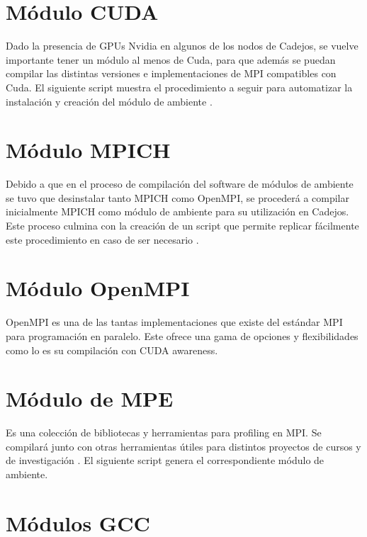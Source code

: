 

\section{Módulo CUDA}
Dado la presencia de GPUs Nvidia en algunos de los  nodos de Cadejos,  se vuelve importante tener un módulo al menos de Cuda, para que además se puedan compilar las distintas  versiones e implementaciones de MPI compatibles con Cuda. El siguiente script muestra el procedimiento a seguir para automatizar la instalación y creación del módulo de ambiente \cite{cudatoolkitinstall}.



\section{Módulo MPICH}
Debido a que en el proceso de compilación del software de módulos de ambiente se tuvo que desinstalar tanto MPICH como OpenMPI, se procederá a compilar inicialmente MPICH como módulo de ambiente para su utilización en Cadejos. Este proceso culmina con la creación de un script que permite replicar fácilmente este procedimiento en caso de ser necesario \cite{filebash}\cite{tildelst}. 



\section{Módulo OpenMPI}
OpenMPI es una de las tantas implementaciones que existe del estándar MPI para programación en paralelo. Este ofrece una gama de opciones y flexibilidades como lo es su compilación con CUDA awareness.



\section{Módulo de MPE}
Es una colección de bibliotecas y herramientas para profiling en MPI. Se compilará junto con otras herramientas útiles para distintos proyectos de cursos y de investigación \cite{mpe}. El siguiente script genera el correspondiente módulo de ambiente.



\section{Módulos GCC}

